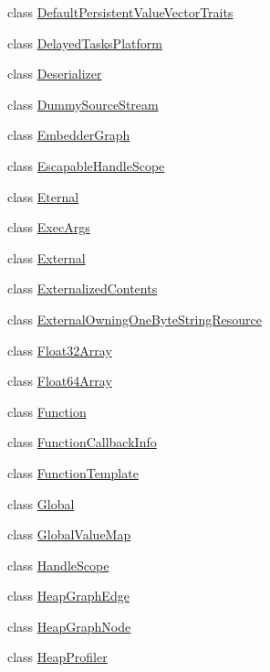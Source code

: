 \begin{DoxyCompactItemize}
\item 
class \mbox{\hyperlink{classv8_1_1DefaultPersistentValueVectorTraits}{Default\+Persistent\+Value\+Vector\+Traits}}
\item 
class \mbox{\hyperlink{classv8_1_1DelayedTasksPlatform}{Delayed\+Tasks\+Platform}}
\item 
class \mbox{\hyperlink{classv8_1_1Deserializer}{Deserializer}}
\item 
class \mbox{\hyperlink{classv8_1_1DummySourceStream}{Dummy\+Source\+Stream}}
\item 
class \mbox{\hyperlink{classv8_1_1EmbedderGraph}{Embedder\+Graph}}
\item 
class \mbox{\hyperlink{classv8_1_1EscapableHandleScope}{Escapable\+Handle\+Scope}}
\item 
class \mbox{\hyperlink{classv8_1_1Eternal}{Eternal}}
\item 
class \mbox{\hyperlink{classv8_1_1ExecArgs}{Exec\+Args}}
\item 
class \mbox{\hyperlink{classv8_1_1External}{External}}
\item 
class \mbox{\hyperlink{classv8_1_1ExternalizedContents}{Externalized\+Contents}}
\item 
class \mbox{\hyperlink{classv8_1_1ExternalOwningOneByteStringResource}{External\+Owning\+One\+Byte\+String\+Resource}}
\item 
class \mbox{\hyperlink{classv8_1_1Float32Array}{Float32\+Array}}
\item 
class \mbox{\hyperlink{classv8_1_1Float64Array}{Float64\+Array}}
\item 
class \mbox{\hyperlink{classv8_1_1Function}{Function}}
\item 
class \mbox{\hyperlink{classv8_1_1FunctionCallbackInfo}{Function\+Callback\+Info}}
\item 
class \mbox{\hyperlink{classv8_1_1FunctionTemplate}{Function\+Template}}
\item 
class \mbox{\hyperlink{classv8_1_1Global}{Global}}
\item 
class \mbox{\hyperlink{classv8_1_1GlobalValueMap}{Global\+Value\+Map}}
\item 
class \mbox{\hyperlink{classv8_1_1HandleScope}{Handle\+Scope}}
\item 
class \mbox{\hyperlink{classv8_1_1HeapGraphEdge}{Heap\+Graph\+Edge}}
\item 
class \mbox{\hyperlink{classv8_1_1HeapGraphNode}{Heap\+Graph\+Node}}
\item 
class \mbox{\hyperlink{classv8_1_1HeapProfiler}{Heap\+Profiler}}

\end{DoxyCompactItemize}
